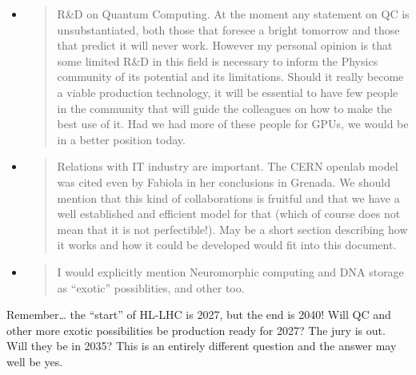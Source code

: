 \documentclass[11pt,a4paper]{article}
\begin{document}
\begin{itemize}
\item
  \begin{quote}
  R\&D on Quantum Computing. At the moment any statement on QC is
  unsubstantiated, both those that foresee a bright tomorrow and those
  that predict it will never work. However my personal opinion is that
  some limited R\&D in this field is necessary to inform the Physics
  community of its potential and its limitations. Should it really
  become a viable production technology, it will be essential to have
  few people in the community that will guide the colleagues on how to
  make the best use of it. Had we had more of these people for GPUs, we
  would be in a better position today.
  \end{quote}
\item
  \begin{quote}
  Relations with IT industry are important. The CERN openlab model was
  cited even by Fabiola in her conclusions in Grenada. We should mention
  that this kind of collaborations is fruitful and that we have a well
  established and efficient model for that (which of course does not
  mean that it is not perfectible!). May be a short section describing
  how it works and how it could be developed would fit into this
  document.
  \end{quote}
\item
  \begin{quote}
  I would explicitly mention Neuromorphic computing and DNA storage as
  ``exotic'' possiblities, and other too.
  \end{quote}
\end{itemize}

Remember\ldots{} the ``start'' of HL-LHC is 2027, but the end is 2040!
Will QC and other more exotic possibilities be production ready for
2027? The jury is out. Will they be in 2035? This is an entirely
different question and the answer may well be yes.
\end{document}

